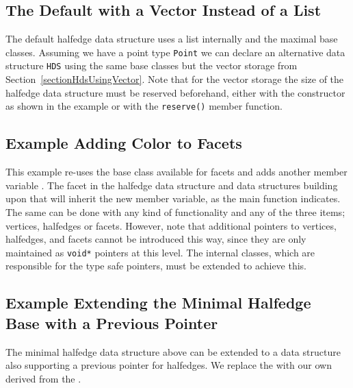 

\subsection{The Default with a Vector Instead of a List}

The default halfedge data structure uses a list internally and the
maximal base classes. Assuming we have a point type {\tt Point} we can
declare an alternative data structure {\tt HDS} using the same base
classes but the vector storage from Section~\ref{sectionHdsUsingVector}.
Note that for the vector storage the size of the halfedge data
structure must be reserved beforehand, either with the constructor as
shown in the example or with the {\tt reserve()} member function.



\subsection{Example Adding Color to Facets}

This example re-uses the base class available for facets and adds
another member variable . The facet in the halfedge data
structure and data structures building upon that will inherit 
the new member variable, as the main function indicates. The same can
be done with any kind of functionality and any of the three items;
vertices, halfedges or facets. However, note that additional pointers
to vertices, halfedges, and facets cannot be introduced this way,
since they are only maintained as {\tt void*} pointers at this
level. The internal classes, which are responsible for the type safe
pointers, must be extended to achieve this.



\subsection{Example Extending the Minimal Halfedge Base with a
  Previous Pointer}

The minimal halfedge data structure above can be extended to a data
structure also supporting a previous pointer for halfedges. We replace
the  with our own 
derived from the .

